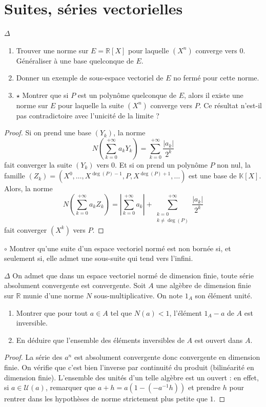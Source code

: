\documentclass[french,a4paper]{article}
\newcommand{\R}{\mathbb{R}}
\newcommand{\K}{\mathbb{K}}
\newcommand{\inv}{^{-1}}
\theoremstyle{plain}
\theoremstyle{definition}
\theoremstyle{remark}
\begin{document}
\section{Suites, séries vectorielles}

\begin{ex}{$\Delta$} 
	\begin{enumerate}
		\item Trouver une norme sur $E=\R[X]$ pour laquelle $(X^n)$ converge vers $0$. Généraliser à une base quelconque de $E$.
		\item Donner un exemple de sous-espace vectoriel de $E$ no fermé pour cette norme.
		\item $\star$ Montrer que si $P$ est un polynôme quelconque de $E$, alors il existe une norme sur $E$ pour laquelle la suite $(X^n)$ converge vers $P$. Ce résultat n'est-il pas contradictoire avec l'unicité de la limite ?
	\end{enumerate}
\end{ex}
\begin{proof}
	Si on prend une base $(Y_k)$, la norme $$N\left(\sum_{k=0}^{+\infty}a_kY_k\right)=\sum_{k=0}^{+\infty}\frac{\lvert a_k\rvert}{2^k}$$ fait converger la suite $(Y_k)$ vers $0$. Et si on prend un polynôme $P$ non nul, la famille $(Z_k)=(X^0,\ldots,X^{\deg(P)-1},P,X^{\deg(P)+1},\ldots)$ est une base de $\K[X]$. Alors, la norme $$N\left(\sum_{k=0}^{+\infty}a_kZ_k\right)=\left\lvert\sum_{k=0}^{+\infty} a_k\right\rvert+\sum_{\substack{k=0 \\ k\ne\deg(P)}}^{+\infty}\frac{\lvert a_k\rvert}{2^k}$$ fait converger $(X^k)$ vers $P$.
\end{proof}

\begin{ex}{$\circ$}
	Montrer qu'une suite d'un espace vectoriel normé est non bornée si, et seulement si, elle admet une sous-suite qui tend vers l'infini.
\end{ex}

\begin{ex}{$\Delta$}
	On admet que dans un espace vectoriel normé de dimension finie, toute série absolument convergente est convergente. Soit $A$ une algèbre de dimension finie sur $\R$ munie d'une norme $N$ sous-multiplicative. On note $1_A$ son élément unité.
	\begin{enumerate}
		\item Montrer que pour tout $a\in A$ tel que $N(a)<1$, l'élément $1_A-a$ de $A$ est inversible.
		\item En déduire que l'ensemble des éléments inversibles de $A$ est ouvert dans $A$.
	\end{enumerate}
\end{ex}
\begin{proof}
	La série des $a^n$ est absolument convergente donc convergente en dimension finie. On vérifie que c'est bien l'inverse par continuité du produit (bilinéarité en dimension finie). L'ensemble des unités d'un telle algèbre est un ouvert : en effet, si $a\in\mathcal{U}(a)$, remarquer que $a+h=a(1-(-a\inv h))$ et prendre $h$ pour rentrer dans les hypothèses de norme strictement plus petite que $1$.
\end{proof}
\end{document}
